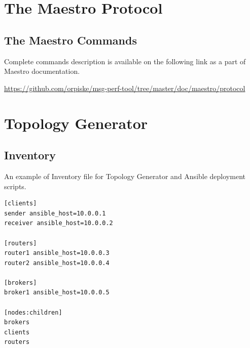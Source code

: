 

\chapter{The Maestro Protocol}

\section{The Maestro Commands}
\label{AP:commands}
Complete commands description is available on the following link as a part of Maestro documentation.

\url{https://github.com/orpiske/msg-perf-tool/tree/master/doc/maestro/protocol}

\chapter{Topology Generator} %

\section{Inventory}
\label{AP:Inventory}
An example of Inventory file for Topology Generator and Ansible deployment scripts.

\begin{verbatim}
[clients]
sender ansible_host=10.0.0.1
receiver ansible_host=10.0.0.2

[routers]
router1 ansible_host=10.0.0.3
router2 ansible_host=10.0.0.4

[brokers]
broker1 ansible_host=10.0.0.5

[nodes:children]
brokers
clients
routers
\end{verbatim}

